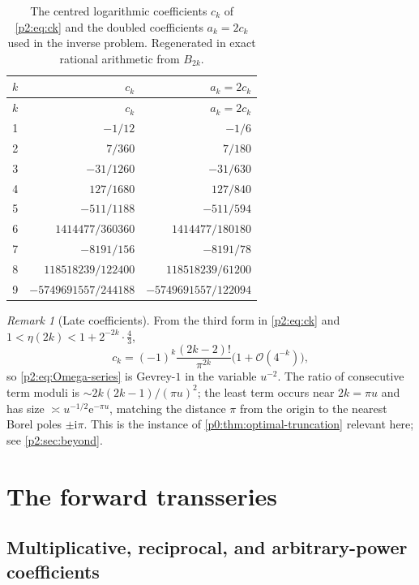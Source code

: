 \documentclass[11pt,a4paper,oneside]{book}
\theoremstyle{plain}
\theoremstyle{definition}
\theoremstyle{remark}
\newtheorem{remark}[theorem]{Remark}
\newcommand{\e}{\mathrm{e}}
\newcommand{\ii}{\mathrm{i}}
\newcommand{\bigO}{\mathcal{O}}
\begin{document}
\begin{center}
\small
\begin{longtable}{c r r}
\caption{The centred logarithmic coefficients \(c_k\) of \cref{p2:eq:ck} and
the doubled coefficients \(a_k=2c_k\) used in the inverse problem.  Regenerated
in exact rational arithmetic from \(B_{2k}\).}
\label{p2:tab:ck}\\
\toprule
\(k\) & \(c_k\) & \(a_k=2c_k\)\\
\midrule
\endfirsthead
\toprule
\(k\) & \(c_k\) & \(a_k=2c_k\)\\
\midrule
\endhead
1 & \(-1/12\) & \(-1/6\)\\
2 & \(7/360\) & \(7/180\)\\
3 & \(-31/1260\) & \(-31/630\)\\
4 & \(127/1680\) & \(127/840\)\\
5 & \(-511/1188\) & \(-511/594\)\\
6 & \(1414477/360360\) & \(1414477/180180\)\\
7 & \(-8191/156\) & \(-8191/78\)\\
8 & \(118518239/122400\) & \(118518239/61200\)\\
9 & \(-5749691557/244188\) & \(-5749691557/122094\)\\
\bottomrule
\end{longtable}
\end{center}

\begin{remark}[Late coefficients]
\label{p2:rem:late}
From the third form in \cref{p2:eq:ck} and \(1<\eta(2k)<1+2^{-2k}\cdot\tfrac43\),
\begin{equation}
 c_k=(-1)^k\frac{(2k-2)!}{\pi^{2k}}\bigl(1+\bigO(4^{-k})\bigr),
 \label{p2:eq:ck-late}
\end{equation}
so \cref{p2:eq:Omega-series} is Gevrey-\(1\) in the variable \(u^{-2}\).  The
ratio of consecutive term moduli is \(\sim2k(2k-1)/(\pi u)^2\); the least term
occurs near \(2k=\pi u\) and has size \(\asymp u^{-1/2}\e^{-\pi u}\), matching
the distance \(\pi\) from the origin to the nearest Borel poles
\(\pm\ii\pi\).  This is the instance of \cref{p0:thm:optimal-truncation}
relevant here; see \cref{p2:sec:beyond}.
\end{remark}

\section{The forward transseries}
\label{p2:sec:forward}

\subsection{Multiplicative, reciprocal, and arbitrary-power coefficients}
\end{document}
